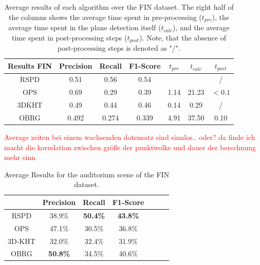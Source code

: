 \documentclass[main.tex]{subfiles}
\begin{document}
\begin{table}[H]
    \centering
    \begin{tabular}{c|cccccc}
        Results FIN & Precision & Recall & F1-Score & $t_{pre}$ & $t_{calc}$ & $t_{post}$ \\ \hline
        RSPD        & 0.51      & 0.56   & 0.54     &           &            & /          \\
        OPS         & 0.69      & 0.29   & 0.39     & 1.14      & 21.23      & $<0.1$     \\
        3DKHT       & 0.49      & 0.44   & 0.46     & 0.14      & 0.29       & /          \\
        OBRG        & 0.492     & 0.274  & 0.339    & 4.91      & 37.50      & 0.10
    \end{tabular}
    \caption[Overall 2D-3D-S Results]{Average results of each algorithm over the FIN dataset. The right half of the columns shows the average time spent in
        pre-processing ($t_{pre}$), the average time spent in the plane detection itself ($t_{calc}$), and the average time spent in post-processing steps ($t_{post}$).
        Note, that the absence of post-processing steps is denoted as "/".}
    \label{tab:res-fin-total}
\end{table}

\textcolor{red}{Average zeiten bei einem wachsenden datensatz sind sinnlos.. oder? da finde ich macht die korrelation zwischen größe
    der punktwolke und dauer der berechnung mehr sinn}


\begin{table}[]
    \centering
    \begin{tabular}{c|cccccc}
               & Precision       & Recall          & F1-Score        \\ \hline
        RSPD   & 38.9\%          & \textbf{50.4\%} & \textbf{43.8\%} \\
        OPS    & 47.1\%          & 30.5\%          & 36.8\%          \\
        3D-KHT & 32.0\%          & 32.4\%          & 31.9\%          \\
        OBRG   & \textbf{50.8\%} & 34.5\%          & 40.6\%
    \end{tabular}%
    \caption{Average Results for the auditorium scene of the FIN dataset.}
    \label{tab:res-fin-audi}
\end{table}
\end{document}
